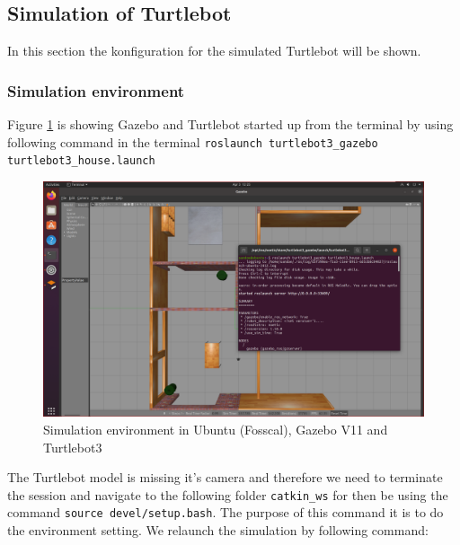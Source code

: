 \documentclass[12pt,a4paper]{article}
\begin{document}
	\subsection{Simulation of Turtlebot}
	In this section the konfiguration for the simulated Turtlebot will be shown.
	\subsubsection{Simulation environment}
	Figure \ref{fig:fig1} is showing Gazebo and Turtlebot started up from the terminal by using following command in the terminal \texttt{roslaunch turtlebot3\_gazebo turtlebot3\_house.launch}
	\begin{figure}[!h]
		\centering
		\includegraphics[width=\linewidth]{fig1.png}
		\caption{Simulation environment in Ubuntu (Fosscal), Gazebo V11 and Turtlebot3}
		\label{fig:fig1}
	\end{figure}
	
	\noindent The Turtlebot model is missing it's camera and therefore we need to terminate the session and navigate to the following folder \texttt{catkin\_ws} for then be using the command \texttt{source devel/setup.bash}. The purpose of this command it is to do the environment setting. We relaunch the simulation by following command:
	
\end{document}
